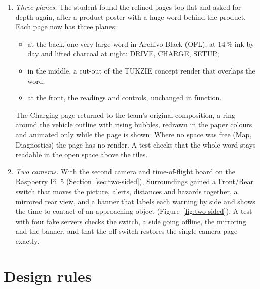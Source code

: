 \begin{enumerate}
\begin{itemize}
  \item fine borders and small radii in place of floating cards;
  \item a flat navigation bar;
  \item the weather inline in the status bar, with no box;
  \item status that never relies on colour alone;
  \item a dark mode designed in its own right;
  \item the team's battery animation kept, in the new colours.
  \end{itemize}
\item \emph{Three planes.} The student found the refined pages too flat and asked for depth again, after a product poster with a huge word behind the product. Each page now has three planes:
  \begin{itemize}
  \item at the back, one very large word in Archivo Black (OFL), at 14\,\% ink by day and lifted charcoal at night: DRIVE, CHARGE, SETUP;
  \item in the middle, a cut-out of the TUKZIE concept render that overlaps the word;
  \item at the front, the readings and controls, unchanged in function.
  \end{itemize}
  The Charging page returned to the team's original composition, a ring around the vehicle outline with rising bubbles, redrawn in the paper colours and animated only while the page is shown. Where no space was free (Map, Diagnostics) the page has no render. A test checks that the whole word stays readable in the open space above the tiles.
\item \emph{Two cameras.} With the second camera and time-of-flight board on the Raspberry Pi~5 (Section~\ref{sec:two-sided}), Surroundings gained a Front/Rear switch that moves the picture, alerts, distances and hazards together, a mirrored rear view, and a banner that labels each warning by side and shows the time to contact of an approaching object (Figure~\ref{fig:two-sided}). A test with four fake servers checks the switch, a side going offline, the mirroring and the banner, and that the off switch restores the single-camera page exactly.
\end{enumerate}

\section{Design rules}


